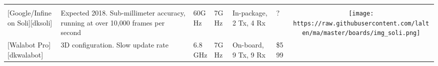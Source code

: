 \begin{longtable}[]{@{}llllllc@{}}
\begin{minipage}[t]{0.10\columnwidth}
\end{minipage}\tabularnewline
\begin{minipage}[t]{0.09\columnwidth}\raggedright\strut
{[}Google/Infineon Soli{]}{[}dksoli{]}\strut
\end{minipage} & \begin{minipage}[t]{0.13\columnwidth}\raggedright\strut
Expected 2018. Sub-millimeter accuracy, running at over 10,000 frames
per second \cite{Lien2016}\strut
\end{minipage} & \begin{minipage}[t]{0.09\columnwidth}\raggedright\strut
60GHz\strut
\end{minipage} & \begin{minipage}[t]{0.11\columnwidth}\raggedright\strut
7GHz\strut
\end{minipage} & \begin{minipage}[t]{0.10\columnwidth}\raggedright\strut
In-package, 2 Tx, 4 Rx\strut
\end{minipage} & \begin{minipage}[t]{0.15\columnwidth}\raggedright\strut
?\strut
\end{minipage} & \begin{minipage}[t]{0.10\columnwidth}\centering\strut
\texttt{[image: https://raw.githubusercontent.com/lalten/ma/master/boards/img\_soli.png]}\strut
\end{minipage}\tabularnewline
\begin{minipage}[t]{0.09\columnwidth}\raggedright\strut
{[}Walabot Pro{]}{[}dkwalabot{]}\strut
\end{minipage} & \begin{minipage}[t]{0.13\columnwidth}\raggedright\strut
3D configuration. Slow update rate\strut
\end{minipage} & \begin{minipage}[t]{0.09\columnwidth}\raggedright\strut
6.8GHz\strut
\end{minipage} & \begin{minipage}[t]{0.11\columnwidth}\raggedright\strut
7GHz\strut
\end{minipage} & \begin{minipage}[t]{0.10\columnwidth}\raggedright\strut
On-board, 9 Tx, 9 Rx\strut
\end{minipage} & \begin{minipage}[t]{0.15\columnwidth}\raggedright\strut
\$599\strut
\end{minipage} & \begin{minipage}[t]{0.10\columnwidth}\centering\strut

\end{minipage}
\end{longtable}
